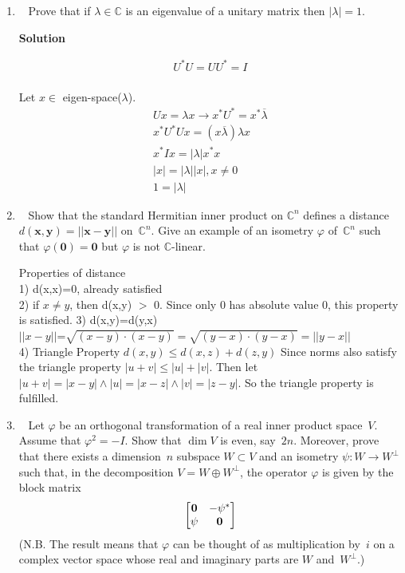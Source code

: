 \documentclass[11pt]{article}
\makeatletter
\newcommand\score[1]{\marginpar{\vspace{-2ex}\color{blue}{#1/3}}\hspace{-1ex}}
\newcommand\0{\mathbf{0}}
\newcommand\CC{\mathbb{C}}
\newcommand\xx{\mathbf{x}}
\newcommand\yy{\mathbf{y}}
\newcommand\<{\langle}
\renewcommand\>{\rangle}
\newcommand\twobytwo[1]{\left[\begin{array}{@{}cc@{}}#1\end{array}\right]}
\makeatother
\begin{document}
\begin{enumerate}
Where $A^{\vert}=A^{-}$, implies that the 2$\times$2 matrix is complex linear(from the $n=1$ case).
We now see that the matrix is commutatitve if and only if every 2$\times$2 is complex linear
which iff the matrix is complex linear.


\item\ \score{}%
Prove that if $\lambda \in \CC$ is an eigenvalue of a unitary matrix
then $|\lambda| = 1$.

\textbf{Solution}

\begin{align*}
  U^{*}U=UU^{*}=I\\
\end{align*}

Let $x \in $ eigen-space($\lambda$).
\begin{align*}
  Ux=\lambda x \rightarrow x^{*}U^{*}=x^{*} \overline{\lambda}\\
  x^{*} U^{*}Ux=(x \overline{\lambda})\lambda x\\
  x^{*}Ix=\vert\lambda| x^{*}x\\
  |x|= |\lambda||x|, x\neq0\\
  1=|\lambda|
\end{align*}

\item\ \score{}%
Show that the standard Hermitian inner product on $\CC^n$ defines a
distance $d(\xx,\yy) = ||\xx-\yy||$ on~$\CC^n$.  Give an example of an
isometry $\varphi$ of~$\CC^n$ such that $\varphi(\0) = \0$ but
$\varphi$ is not $\CC$-linear.

Properties of distance\\
1) d(x,x)=0, already satisfied\\
2) if $x\neq y$, then d(x,y) $>$ 0. Since only 0 has absolute
value 0, this property is satisfied.
3) d(x,y)=d(y,x)\\
$||x-y||$=$\sqrt{(x-y) \cdot (x-y)} = \sqrt{(y-x) \cdot (y-x) } = ||y-x||$\\

4) Triangle Property
$d(x,y)\leq d(x,z) + d(z,y)$
Since norms also satisfy the triangle property $|u+v| \leq |u| + |v|$.
Then let $|u+v|=|x-y| \wedge |u|=|x-z| \wedge |v|=|z-y|$. So the triangle property is fulfilled.


\item\ \score{}%
Let $\varphi$ be an orthogonal transformation of a real inner product
space~$V$.  Assume that $\varphi^2 = -I$.  Show that $\dim V$ is even,
say~$2n$.  Moreover, prove that there exists a dimension~$n$ subspace
$W \subset V$ and an
isometry $\psi: W \to W^\perp$ such that, in the decomposition $V = W
\oplus W^\perp$, the operator $\varphi$ is given by the block matrix
$$%
  \twobytwo{ \0  & -\psi^*
          \\ \psi &    \0 }
$$%
(N.B. The result means that $\varphi$ can be thought of as
multiplication by~$i$ on a complex vector space whose real and
imaginary parts are $W$ and~$W^\perp$.)


\end{enumerate}
\end{document}
